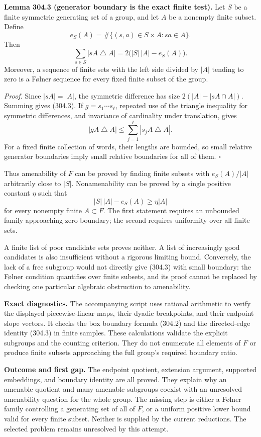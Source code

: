 \documentclass[11pt]{article}
\begin{document}
\textbf{Lemma 304.3 (generator boundary is the exact finite test).} Let $S$ be a finite symmetric generating set of a group, and let $A$ be a nonempty finite subset. Define
\[
 e_S(A)=\#\{(s,a)\in S\times A:sa\in A\}.
\]
Then
\[
 \sum_{s\in S}|sA\mathbin{\triangle}A|
       =2\bigl(|S|\,|A|-e_S(A)\bigr).
 \tag{304.3}
\]
Moreover, a sequence of finite sets with the left side divided by $|A|$ tending to zero is a F\o lner sequence for every fixed finite subset of the group.

\emph{Proof.} Since $|sA|=|A|$, the symmetric difference has size $2(|A|-|sA\cap A|)$. Summing gives (304.3). If $g=s_1\cdots s_\ell$, repeated use of the triangle inequality for symmetric differences, and invariance of cardinality under translation, gives
\[
 |gA\mathbin{\triangle}A|
 \leq\sum_{j=1}^{\ell}|s_jA\mathbin{\triangle}A|.
\]
For a fixed finite collection of words, their lengths are bounded, so small relative generator boundaries imply small relative boundaries for all of them. $\square$

Thus amenability of $F$ can be proved by finding finite subsets with $e_S(A)/|A|$ arbitrarily close to $|S|$. Nonamenability can be proved by a single positive constant $\eta$ such that
\[
 |S|\,|A|-e_S(A)\geq\eta|A|
\]
for every nonempty finite $A\subset F$. The first statement requires an unbounded family approaching zero boundary; the second requires uniformity over all finite sets.

A finite list of poor candidate sets proves neither. A list of increasingly good candidates is also insufficient without a rigorous limiting bound. Conversely, the lack of a free subgroup would not directly give (304.3) with small boundary: the F\o lner condition quantifies over finite subsets, and its proof cannot be replaced by checking one particular algebraic obstruction to amenability.

\textbf{Exact diagnostics.} The accompanying script uses rational arithmetic to verify the displayed piecewise-linear maps, their dyadic breakpoints, and their endpoint slope vectors. It checks the box boundary formula (304.2) and the directed-edge identity (304.3) in finite samples. These calculations validate the explicit subgroups and the counting criterion. They do not enumerate all elements of $F$ or produce finite subsets approaching the full group's required boundary ratio.

\textbf{Outcome and first gap.} The endpoint quotient, extension argument, supported embeddings, and boundary identity are all proved. They explain why an amenable quotient and many amenable subgroups coexist with an unresolved amenability question for the whole group. The missing step is either a F\o lner family controlling a generating set of all of $F$, or a uniform positive lower bound valid for every finite subset. Neither is supplied by the current reductions. The selected problem remains unresolved by this attempt.
\end{document}
